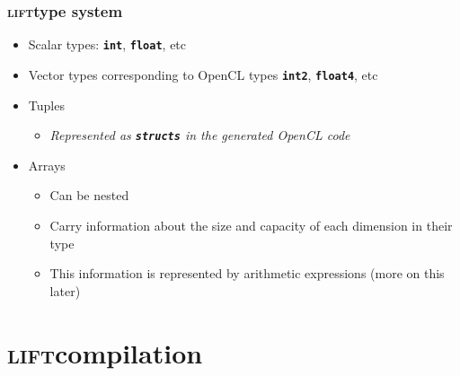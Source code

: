 \documentclass[10pt]{beamer}
\newcommand{\lift}{\textsc{lift}\space}
\newcommand{\code}[1]{\textbf{\texttt{#1}}}
\begin{document}
\begin{frame}
\frametitle{\lift type system}
\begin{itemize}
	\item Scalar types: \code{int}, \code{float}, etc
	\item Vector types corresponding to OpenCL types \code{int2}, \code{float4}, etc
	\item Tuples
	\begin{itemize}
		\item \textit{Represented as \code{structs} in the generated OpenCL code}
	\end{itemize}
	\item Arrays
	\begin{itemize}
		\item Can be nested
		\item Carry information about the size and capacity of each dimension in their type
		\item This information is represented by arithmetic expressions (more on this later)
	\end{itemize}
\end{itemize}
\end{frame}

\section{\lift compilation}
\end{document}
